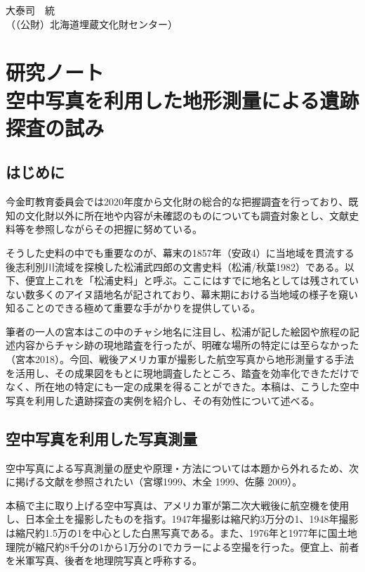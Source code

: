 \documentclass[a4j,11pt,twocolumn,openany]{jsbook}
\begin{document}
\begin{flushright}
	大泰司　統\\（（公財）北海道埋蔵文化財センター）
\end{flushright}


\chapter{研究ノート\\空中写真を利用した地形測量による遺跡探査の試み}

\section{はじめに}
今金町教育委員会では2020年度から文化財の総合的な把握調査を行っており、既知の文化財以外に所在地や内容が未確認のものについても調査対象とし、文献史料等を参照しながらその把握に努めている。

そうした史料の中でも重要なのが、幕末の1857年（安政4）に当地域を貫流する後志利別川流域を探検した松浦武四郎の文書史料（松浦/秋葉1982）である。以下、便宜上これを「松浦史料」と呼ぶ。ここにはすでに地名としては残されていない数多くのアイヌ語地名が記されており、幕末期における当地域の様子を窺い知ることのできる極めて重要な手がかりを提供している。

筆者の一人の宮本はこの中のチャシ地名に注目し、松浦が記した絵図や旅程の記述内容からチャシ跡の現地踏査を行ったが、明確な場所の特定には至らなかった（宮本2018）。今回、戦後アメリカ軍が撮影した航空写真から地形測量する手法を活用し、その成果図をもとに現地調査したところ、踏査を効率化できただけでなく、所在地の特定にも一定の成果を得ることができた。本稿は、こうした空中写真を利用した遺跡探査の実例を紹介し、その有効性について述べる。

\section{空中写真を利用した写真測量}

空中写真による写真測量の歴史や原理・方法については本題から外れるため、次に掲げる文献を参照されたい（宮塚1999、木全 1999、佐藤 2009）。

本稿で主に取り上げる空中写真は、アメリカ軍が第二次大戦後に航空機を使用し、日本全土を撮影したものを指す。1947年撮影は縮尺約3万分の1、1948年撮影は縮尺約1.5万の1を中心とした白黒写真である。また、1976年と1977年に国土地理院が縮尺約8千分の1から1万分の1でカラーによる空撮を行った。便宜上、前者を米軍写真、後者を地理院写真と呼称する。
\end{document}

